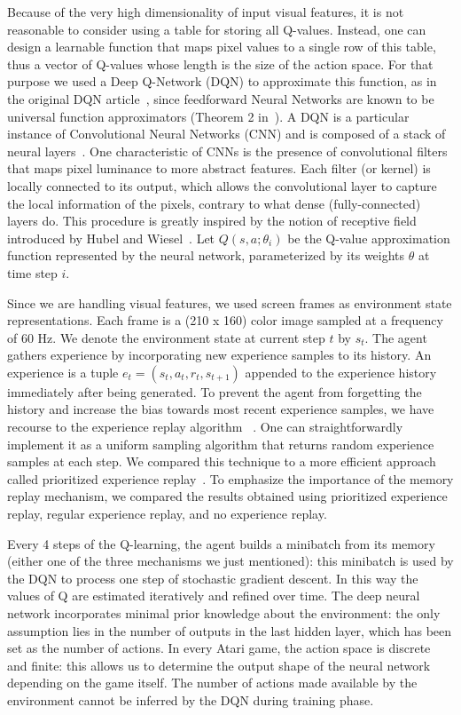 \documentclass[letterpaper]{article}
\begin{document}
Because of the very high dimensionality of input visual features, it is not reasonable to consider using a table for storing all Q-values.
Instead, one can design a learnable function that maps pixel values to a single row of this table, thus a vector of Q-values whose length is the size
of the action space. For that purpose we used a Deep Q-Network (DQN) to approximate this function, as in the original DQN article~\citep{Mnih2015}, since feedforward Neural Networks
are known to be universal function approximators (Theorem 2 in~\cite{hornik1991approximation}).
A DQN is a particular instance of Convolutional Neural Networks (CNN) and is composed of a stack of neural layers~\citep{lecun1998gradient}. One characteristic of CNNs is the
presence of convolutional filters that maps pixel luminance to more abstract features. Each filter (or kernel) is locally connected to its output, which
allows the convolutional layer to capture the local information of the pixels, contrary to what dense (fully-connected) layers do. This procedure is greatly
inspired by the notion of receptive field introduced by Hubel and Wiesel~\citep{Hubel1962}.
Let $Q(s, a; \theta_i)$ be the Q-value approximation function represented by the neural network, parameterized by its weights $\theta$ at time step $i$.

Since we are handling visual features, we used screen frames as environment state representations. Each frame is a (210 x 160) color image sampled at
a frequency of 60 Hz. We denote the environment state at current step $t$ by $s_t$. The agent gathers experience by incorporating new experience samples
to its history. An experience is a tuple $e_t = (s_t, a_t, r_t, s_{t+1})$ appended to the experience history immediately after being generated.
To prevent the agent from forgetting the history and increase the bias towards most recent experience samples, we have recourse to the experience
replay algorithm ~\citep{adam2012experience}. One can straightforwardly implement it as a uniform sampling algorithm that returns random experience samples at each step.
We compared this technique to a more efficient approach called prioritized experience replay~\citep{DBLP:journals/corr/SchaulQAS15}.
To emphasize the importance of the memory replay mechanism, we compared the results obtained using prioritized experience replay, regular
experience replay, and no experience replay.

Every 4 steps of the Q-learning, the agent builds a minibatch from its memory (either one of the three mechanisms we just mentioned):
this minibatch is used by the DQN to process one step of stochastic gradient descent. In this way the values of Q are estimated iteratively and
refined over time. The deep neural network incorporates minimal prior knowledge about the environment: the only assumption lies in the number of
outputs in the last hidden layer, which has been set as the number of actions. In every Atari game, the action space is discrete and finite: this allows
us to determine the output shape of the neural network depending on the game itself. The number of actions made available by the environment
cannot be inferred by the DQN during training phase.
\end{document}
